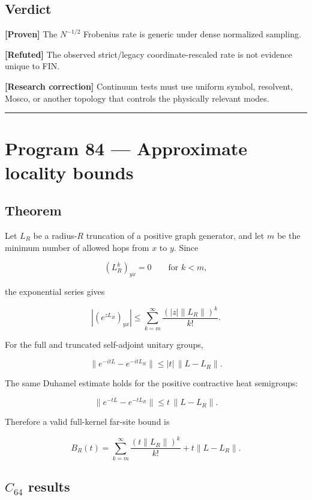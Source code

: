 \documentclass[11pt,a4paper,openany]{report}
\newcommand{\statusProven}{\textcolor{fingreen}{[Proven]}}
\newcommand{\statusRefuted}{\textcolor{finred}{[Refuted]}}
\begin{document}
\section{Verdict}

\textbf{\statusProven{}} The \(N^{-1/2}\) Frobenius rate is generic under dense normalized sampling.

\textbf{\statusRefuted{}} The observed strict/\allowbreak{}legacy coordinate-rescaled rate is not evidence unique to FIN.

\textbf{[Research correction]} Continuum tests must use uniform symbol, resolvent, Mosco, or another topology that controls the physically relevant modes.

\par\medskip\hrule\medskip

\chapter{Program 84 --- Approximate locality bounds}

\section{Theorem}

Let \(L_R\) be a radius-\(R\) truncation of a positive graph generator, and let \(m\) be the minimum number of allowed hops from \(x\) to \(y\). Since

\[
(L_R^k)_{yx}=0
\qquad
\text{for }k<m,
\]

the exponential series gives

\[
\left|
\left(e^{zL_R}\right)_{yx}
\right|
\le
\sum_{k=m}^\infty
\frac{(|z|\|L_R\|)^k}{k!}.
\]

For the full and truncated self-adjoint unitary groups,

\[
\|e^{-itL}-e^{-itL_R}\|
\le
|t|\,\|L-L_R\|.
\]

The same Duhamel estimate holds for the positive contractive heat semigroups:

\[
\|e^{-tL}-e^{-tL_R}\|
\le
t\,\|L-L_R\|.
\]

Therefore a valid full-kernel far-site bound is

\[
B_R(t)
=
\sum_{k=m}^\infty
\frac{(t\|L_R\|)^k}{k!}
+
t\|L-L_R\|.
\]

\section{\texorpdfstring{\(C_{64}\) results}{C\_64 results}}
\end{document}
